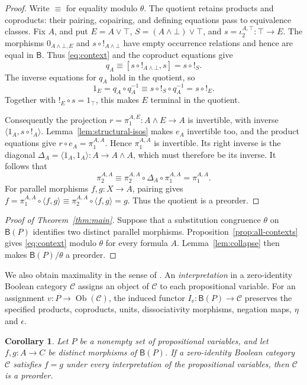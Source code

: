 \documentclass[11pt]{article}
\newtheorem{corollary}[theorem]{Corollary}
\newcommand{\B}{\mathsf B}
\begin{document}
\begin{proof}
Write $\equiv$ for equality modulo $\theta$.
The quotient retains products and coproducts: their pairing,
copairing, and defining equations pass to equivalence classes.
Fix $A$, and put
$E=A\vee\top$, $S=(A\wedge\bot)\vee\top$, and
$s=\iota_2^{A,\top}:\top\to E$.
The morphisms $0_{A\wedge\bot,E}$ and $s\circ!_{A\wedge\bot}$ have
empty occurrence relations and hence are equal in $\B$. Thus
\eqref{eq:context} and the coproduct equations give
\[
 q_A\equiv[s\circ!_{A\wedge\bot},s]=s\circ!_S.
\]
The inverse equations for $q_A$ hold in the quotient, so
\[
 1_E=q_A\circ q_A^{-1}
    \equiv s\circ!_S\circ q_A^{-1}=s\circ!_E.
\]
Together with $!_E\circ s=1_\top$, this makes $E$ terminal in the
quotient.

Consequently the projection
$r=\pi_1^{A,E}:A\wedge E\to A$ is invertible, with inverse
$\langle1_A,s\circ!_A\rangle$.
Lemma~\ref{lem:structural-isos} makes $e_A$ invertible too, and the
product equations give
$r\circ e_A=\pi_1^{A,A}$.
Hence $\pi_1^{A,A}$ is invertible. Its right inverse is the diagonal
$\Delta_A=\langle1_A,1_A\rangle:A\to A\wedge A$, which must
therefore be its inverse. It follows that
\[
 \pi_2^{A,A}
   \equiv\pi_2^{A,A}\circ\Delta_A\circ\pi_1^{A,A}
   =\pi_1^{A,A}.
\]
For parallel morphisms $f,g:X\to A$, pairing gives
$f=\pi_1^{A,A}\circ\langle f,g\rangle
 \equiv\pi_2^{A,A}\circ\langle f,g\rangle=g$.
Thus the quotient is a preorder.
\end{proof}

\begin{proof}[Proof of Theorem~\ref{thm:main}]
Suppose that a substitution congruence $\theta$ on $\B(P)$ identifies
two distinct parallel morphisms. Proposition~\ref{prop:all-contexts}
gives \eqref{eq:context} modulo $\theta$ for every formula $A$.
Lemma~\ref{lem:collapse} then makes $\B(P)/\theta$ a preorder.
\end{proof}

We also obtain maximality in the sense of
\cite[\S9.3, p.~194]{DP}. An \emph{interpretation} in a zero-identity
Boolean category $\mathcal C$ assigns an object of $\mathcal C$ to
each propositional variable. For an assignment
$v:P\to\operatorname{Ob}(\mathcal C)$, the induced functor
$I_v:\B(P)\to\mathcal C$ preserves the specified products, coproducts,
units, dissociativity morphisms, negation maps, $\eta$ and $\epsilon$.

\begin{corollary}\label{cor:models}
Let $P$ be a nonempty set of propositional variables, and let
$f,g:A\to C$ be distinct morphisms of $\B(P)$.
If a zero-identity Boolean category $\mathcal C$ satisfies $f=g$
under every interpretation of the propositional variables, then
$\mathcal C$ is a preorder.
\end{corollary}
\end{document}
